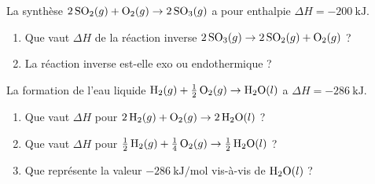 \documentclass[11pt,a4paper]{article}
\newcommand{\dH}{\Delta H}
\begin{document}
\begin{exercice}
La synthèse \;$2\,\ce{SO2}(g) + \ce{O2}(g) \rightarrow 2\,\ce{SO3}(g)$\; a pour enthalpie
$\dH = \SI{-200}{\kilo\joule}$.
\begin{enumerate}[label=\alph*),leftmargin=2em,topsep=2pt,itemsep=2pt]
  \item Que vaut $\dH$ de la réaction inverse \;$2\,\ce{SO3}(g) \rightarrow 2\,\ce{SO2}(g) + \ce{O2}(g)$ ?
  \item La réaction inverse est-elle exo ou endothermique ?
\end{enumerate}
\end{exercice}

\begin{exercice}
La formation de l'eau liquide \;$\ce{H2}(g) + \tfrac12\,\ce{O2}(g) \rightarrow \ce{H2O}(l)$\; a
$\dH = \SI{-286}{\kilo\joule}$.
\begin{enumerate}[label=\alph*),leftmargin=2em,topsep=2pt,itemsep=2pt]
  \item Que vaut $\dH$ pour \;$2\,\ce{H2}(g) + \ce{O2}(g) \rightarrow 2\,\ce{H2O}(l)$ ?
  \item Que vaut $\dH$ pour \;$\tfrac12\,\ce{H2}(g) + \tfrac14\,\ce{O2}(g) \rightarrow \tfrac12\,\ce{H2O}(l)$ ?
  \item Que représente la valeur $\SI{-286}{\kilo\joule\per\mol}$ vis-à-vis de $\ce{H2O}(l)$ ?
\end{enumerate}
\end{exercice}
\end{document}
